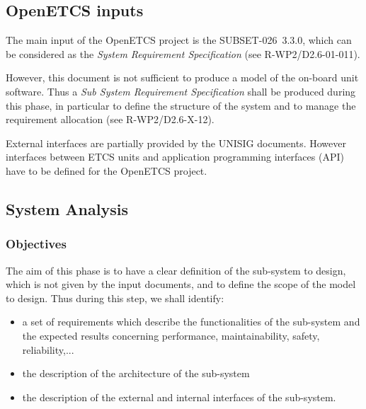 
\subsection{OpenETCS inputs}
\label{sec:inputs}

\tbd

The main input of the OpenETCS project is the SUBSET-026~3.3.0, which can be considered as the \emph{System Requirement Specification} (see R-WP2/D2.6-01-011).



However, this document is not sufficient to produce a model of the on-board unit software. Thus a \emph{Sub System Requirement Specification} shall be produced during this phase, in particular to define the structure of the system and to manage the requirement allocation (see R-WP2/D2.6-X-12).

External interfaces are partially provided by the UNISIG documents. However interfaces between ETCS units and application programming interfaces (API)  have to be defined for the OpenETCS project.




\subsection{System Analysis}
\label{sec:sys-analysis}


\subsubsection{Objectives}
\label{sec:sys-ana-objective}

The aim of this phase is to have a clear definition of the sub-system to design, which is not given by the input documents, and to define the scope of the model to design. Thus during this step, we shall identify:

\begin{itemize}
\item a set of requirements which describe the functionalities of the sub-system and the expected results concerning performance, maintainability, safety, reliability,...
\item the description of the architecture of the sub-system
\item the description of the external and internal interfaces of the sub-system.
\end{itemize}

